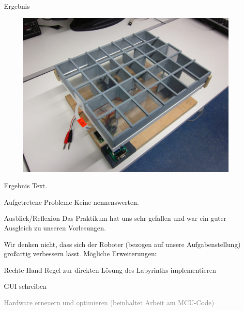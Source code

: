 \documentclass{beamer}
\begin{document}
\begin{frame}[fragile,t]{Ergebnis}
\begin{figure}
  \centering
  \includegraphics[scale=.0675]{roboter}
\end{figure}
\end{frame}

\begin{frame}[fragile,t]{Ergebnis}
Text.
\end{frame}

\begin{frame}[fragile,t]{Aufgetretene Probleme}
Keine nennenswerten. 
\end{frame}

\begin{frame}[fragile,t]{Ausblick/Reflexion}
Das Praktikum hat uns sehr gefallen und war ein guter Ausgleich zu unseren Vorlesungen.

\medskip\noindent
Wir denken nicht, dass sich der Roboter (bezogen auf unsere Aufgabenstellung) großartig verbessern lässt. Mögliche Erweiterungen:
\begin{itemize}
\item Rechte-Hand-Regel zur direkten Lösung des Labyrinths implementieren
\item GUI schreiben
\textcolor{gray}{
\item[\textcolor{gray}{$\triangleright$}] Hardware erneuern und optimieren (beinhaltet Arbeit am MCU-Code)
}
\end{itemize}
\end{frame}


\end{document}
